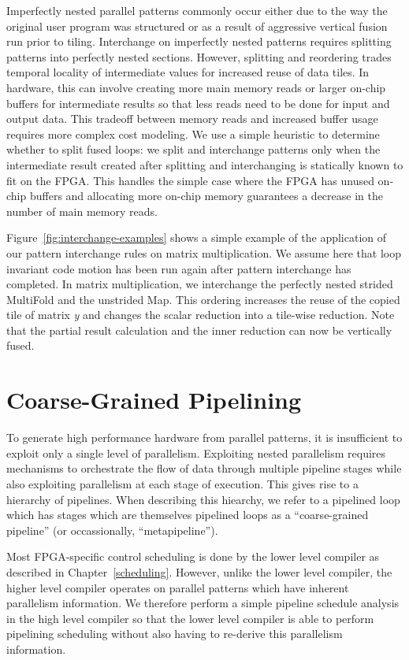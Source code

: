 Imperfectly nested parallel patterns commonly occur either due to the way the original user program was structured or
as a result of aggressive vertical fusion run prior to tiling.
Interchange on imperfectly nested patterns requires splitting patterns into perfectly nested sections. However, splitting and reordering trades
temporal locality of intermediate values for increased reuse of data tiles. In hardware, this can involve creating more main memory
reads or larger on-chip buffers for intermediate results so that less reads need to be done for input and output data. This tradeoff between memory reads and
increased buffer usage requires more complex cost modeling.
We use a simple heuristic to determine whether to split fused loops: we split and interchange patterns only when
the intermediate result created after splitting and interchanging is statically known to fit on the FPGA. This handles the simple case
where the FPGA has unused on-chip buffers and allocating more on-chip memory guarantees a decrease in the number of main memory reads.

Figure~\ref{fig:interchange-examples} shows a simple example of the application of our pattern interchange rules on matrix multiplication.
We assume here that loop invariant code motion has been run again after pattern interchange has completed.
In matrix multiplication, we interchange the perfectly nested strided MultiFold and the unstrided Map.
This ordering increases the reuse of the copied tile of matrix \emph{y} and changes the scalar reduction into a tile-wise reduction.
Note that the partial result calculation and the inner reduction can now be vertically fused.

\section{Coarse-Grained Pipelining}
To generate high performance hardware from parallel patterns, it is insufficient
to exploit only a single level of parallelism. Exploiting nested parallelism
requires mechanisms to orchestrate the flow of data through multiple pipeline
stages while also exploiting parallelism at each stage of execution.
This gives rise to a hierarchy of pipelines.
When describing this hiearchy, we refer to a pipelined loop which has
stages which are themselves pipelined loops as a
``coarse-grained pipeline'' (or occassionally, ``metapipeline'').

Most FPGA-specific control scheduling is done by the lower level compiler as described in Chapter~\ref{scheduling}. However, unlike the lower level compiler, the higher level
compiler operates on parallel patterns which have inherent parallelism information.
We therefore perform a simple pipeline schedule analysis in the high level compiler
so that the lower level compiler is able to perform pipelining scheduling without
also having to re-derive this parallelism information.

